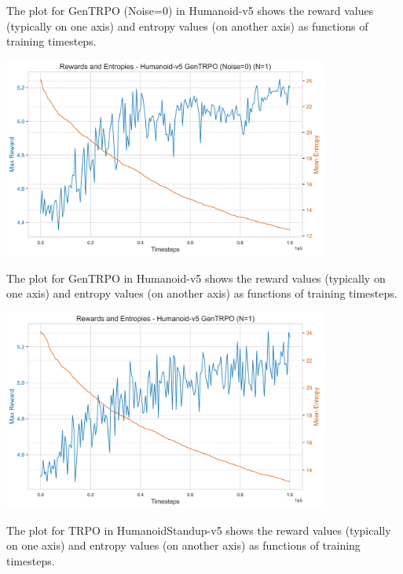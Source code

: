 \documentclass{svproc}
\begin{document}
The plot for GenTRPO (Noise=0) in Humanoid-v5 shows the reward values (typically on one axis) and entropy values (on another axis) as functions of training timesteps.

\begin{center}
\includegraphics[width=0.8\textwidth]{graph_Humanoid-v5_gentrpo_rewards_entropies.png}
\end{center}

The plot for GenTRPO in Humanoid-v5 shows the reward values (typically on one axis) and entropy values (on another axis) as functions of training timesteps.

\begin{center}
\includegraphics[width=0.8\textwidth]{graph_Humanoid-v5_gentrpo-ne_rewards_entropies.png}
\end{center}

The plot for TRPO in HumanoidStandup-v5 shows the reward values (typically on one axis) and entropy values (on another axis) as functions of training timesteps.
\end{document}
